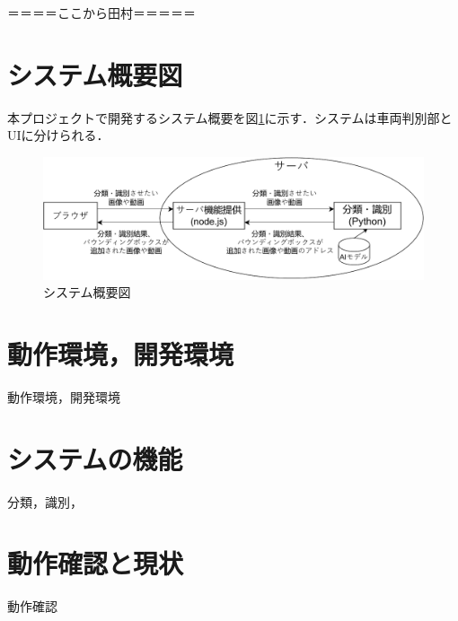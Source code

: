 ＝＝＝＝ここから田村＝＝＝＝＝

\section{システム概要図}
本プロジェクトで開発するシステム概要を図\ref{FIG}に示す．システムは車両判別部とUIに分けられる．

\begin{figure}
	\centering
	\includegraphics [width=\linewidth]{chap2/fig/sys_gaiyou6.pdf}
	\caption{システム概要図}
	\label{FIG}
\end{figure}

\section{動作環境，開発環境}
動作環境，開発環境
\section{システムの機能}
分類，識別，
\section{動作確認と現状}
動作確認

